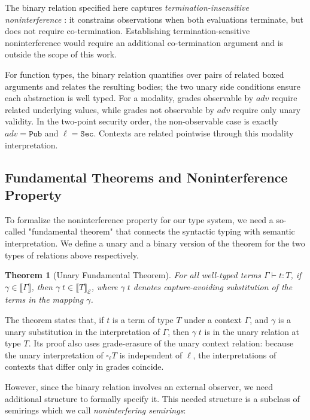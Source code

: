 \documentclass[conference]{IEEEtran}
\newcommand\public{\texttt{Pub}}
\newcommand\secret{\texttt{Sec}}
\newcommand\cale{\mathcal{E}}
\newtheorem{theorem}{Theorem}
\begin{document}
The binary relation specified here captures \emph{termination-insensitive noninterference} \cite{volpano1996sound}: it constrains observations when both evaluations terminate, but does not require co-termination. Establishing termination-sensitive noninterference would require an additional co-termination argument and is outside the scope of this work.

For function types, the binary relation quantifies over pairs of related boxed arguments and relates the resulting bodies; the two unary side conditions ensure each abstraction is well typed. For a modality, grades observable by $adv$ require related underlying values, while grades not observable by $adv$ require only unary validity. In the two-point security order, the non-observable case is exactly $adv=\public$ and $\ell=\secret$. Contexts are related pointwise through this modality interpretation.

\subsection{Fundamental Theorems and Noninterference Property}

To formalize the noninterference property for our type system, we need a so-called "fundamental theorem" that connects the syntactic typing with semantic interpretation. We define a unary and a binary version of the theorem for the two types of relations above respectively.

\begin{theorem}[Unary Fundamental Theorem]
    For all well-typed terms $\Gamma\vdash t:T$, if $\gamma\in\llbracket\Gamma\rrbracket$, then $\gamma\; t\in\llbracket T\rrbracket_\cale$, where $\gamma\; t$ denotes capture-avoiding substitution of the terms in the mapping $\gamma$.
\end{theorem}

The theorem states that, if $t$ is a term of type $T$ under a context $\Gamma$, and $\gamma$ is a unary substitution in the interpretation of $\Gamma$, then $\gamma\; t$ is in the unary relation at type $T$. Its proof also uses grade-erasure of the unary context relation: because the unary interpretation of $\square_\ell T$ is independent of $\ell$, the interpretations of contexts that differ only in grades coincide.

However, since the binary relation involves an external observer, we need additional structure to formally specify it. This needed structure is a subclass of semirings which we call \emph{noninterfering semirings}:
\end{document}
